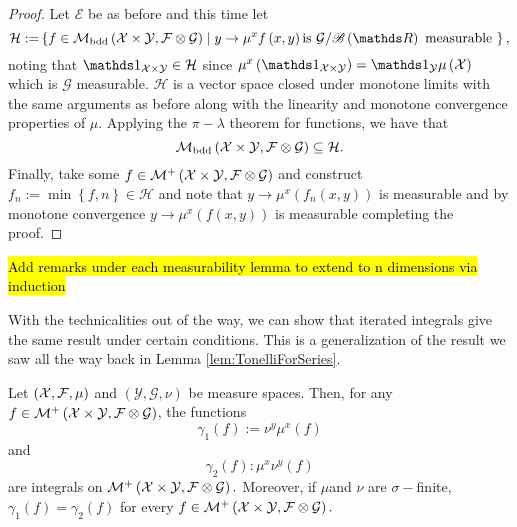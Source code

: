 \begin{proof}
Let $\mathcal{E}$ be as before and this time let
\[
\mathcal{H:=}\left\{ f\in\mathcal{M_{\text{bdd}}}\left(\X\times\mathcal{Y},\mathcal{F}\otimes\mathcal{G}\right)\mid y\to\mu^{x}f\left(x,y\right)\text{is }\mathcal{G}/\borel\left(\R\right)\text{ measurable }\right\} ,
\]
noting that $\indicate_{\X\times\mathcal{Y}}\in\mathcal{H}$ since
$\mu^{x}\left(\indicate_{\X\times\mathcal{Y}}\right)=\indicate_{\mathcal{Y}}\mu\left(\X\right)$
which is $\mathcal{G}$ measurable. $\mathcal{H}$ is a vector space
closed under monotone limits with the same arguments as before along
with the linearity and monotone convergence properties of $\mu$.
Applying the $\pi-\lambda$ theorem for functions, we have that 
\[
\mathcal{M_{\text{bdd}}}\left(\mathcal{X}\times\mathcal{Y},\mathcal{F}\otimes\mathcal{G}\right)\subseteq\mathcal{H}.
\]
Finally, take some $f\in\mathcal{M}^{+}\left(\mathcal{X}\times\mathcal{Y},\mathcal{F}\otimes\mathcal{G}\right)$
and construct $f_{n}:=\min\left\{ f,n\right\} \in\mathcal{H}$ and
note that $y\to\mu^{x}\left(f_{n}\left(x,y\right)\right)$ is measurable
and by monotone convergence $y\to\mu^{x}\left(f\left(x,y\right)\right)$
is measurable completing the proof.
\end{proof}
\hl{Add remarks under each measurability lemma to extend to n dimensions via induction}

With the technicalities out of the way, we can show that iterated
integrals give the same result under certain conditions. This is a
generalization of the result we saw all the way back in Lemma \ref{lem:TonelliForSeries}.
\begin{thm}[Tonelli]
\label{thm:tonelli}Let $\left(\mathcal{X},\mathcal{F},\mu\right)$ and $\left(\mathcal{Y},\mathcal{G},\nu\right)$
be measure spaces. Then, for any $f\in\mathcal{M}^{+}\left(\mathcal{X}\times\mathcal{Y},\mathcal{F}\otimes\mathcal{G}\right)$,
the functions 
\[
\gamma_{1}\left(f\right):=\nu^{y}\mu^{x}\left(f\right)
\]
and
\[
\gamma_{2}\left(f\right):\mu^{x}\nu^{y}\left(f\right)
\]
are integrals on $\mathcal{M}^{+}\left(\mathcal{X}\times\mathcal{Y},\mathcal{F}\otimes\mathcal{G}\right).$
Moreover, if $\mu$and $\nu$ are $\sigma-$finite, $\gamma_{1}\left(f\right)=\gamma_{2}\left(f\right)$
for every $f\in\mathcal{M}^{+}\left(\mathcal{X}\times\mathcal{Y},\mathcal{F}\otimes\mathcal{G}\right).$
\end{thm}

